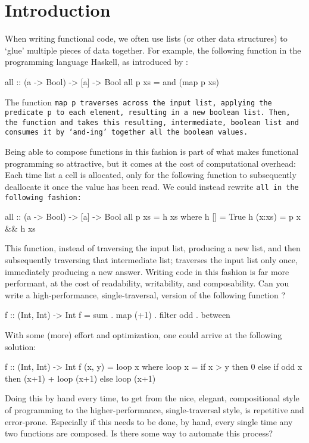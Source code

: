 \section{Introduction}
When writing functional code, we often use lists (or other data structures) to `glue' multiple pieces of data together.
For example, the following function in the programming language Haskell, as introduced by \cite{Gill1993}:
\begin{code}
all :: (a -> Bool) -> [a] -> Bool
all p xs = and (map p xs)
\end{code}
The function \tt{map p} traverses across the input list, applying the predicate \tt{p} to each element, resulting in a new boolean list.
Then, the function \tt{and} takes this resulting, intermediate, boolean list and consumes it by `and-ing' together all the boolean values.

Being able to compose functions in this fashion is part of what makes functional programming so attractive, but it comes at the cost of computational overhead:
Each time list a cell is allocated, only for the following function to subsequently deallocate it once the value has been read.
We could instead rewrite \tt{all} in the following fashion:
\begin{code}
all :: (a -> Bool) -> [a] -> Bool
all p xs = h xs
  where h []     = True
        h (x:xs) = p x && h xs
\end{code}
This function, instead of traversing the input list, producing a new list, and then subsequently traversing that intermediate list; traverses the input list only once, immediately producing a new answer.
Writing code in this fashion is far more performant, at the cost of readability, writability, and composability.
Can you write a high-performance, single-traversal, version of the following function \citep{Harper2011}?
\begin{code}
f :: (Int, Int) -> Int
f = sum . map (+1) . filter odd . between
\end{code}
With some (more) effort and optimization, one could arrive at the following solution:
\begin{code}
f :: (Int, Int) -> Int
f (x, y) = loop x
  where loop x = if x > y
                 then 0
                 else if odd x
                      then (x+1) + loop (x+1)
                      else loop (x+1)
\end{code}
Doing this by hand every time, to get from the nice, elegant, compositional style of programming to the higher-performance, single-traversal style, is repetitive and error-prone.
Especially if this needs to be done, by hand, every single time any two functions are composed.
Is there some way to automate this process?

